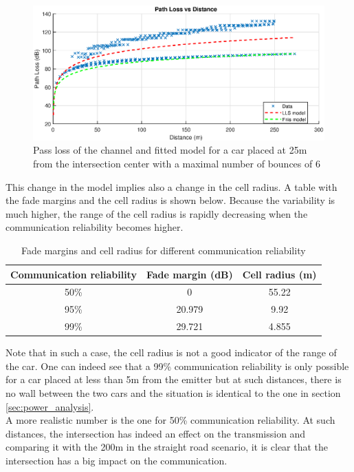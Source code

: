 \documentclass[10pt,a4paper]{ULBreport}
\begin{document}
\begin{figure}
    \centering
    \includegraphics[width=1\textwidth]{6_2.eps}
    \caption{Pass loss of the channel and fitted model for a car placed at 25m from the intersection center with a maximal number of bounces of 6}
    \label{fig:pass_loss_2}
\end{figure}

This change in the model implies also a change in the cell radius. A table with the fade margins and the cell radius is shown below. Because the variability is much higher, the range of the cell radius is rapidly decreasing when the communication reliability becomes higher. \\

\begin{table}[H]
    \centering
    \begin{tabular}{|c|c|c|}
        \hline
        Communication reliability & Fade margin (dB) & Cell radius (m) \\ \hline
        50\% & 0 & 55.22 \\ \hline
        95\% & 20.979 & 9.92 \\ \hline
        99\% & 29.721 & 4.855 \\ \hline
    \end{tabular}
    \caption{Fade margins and cell radius for different communication reliability}
    \label{tab:fade_margins_2}
\end{table}

Note that in such a case, the cell radius is not a good indicator of the range of the car. One can indeed see that a 99\% communication reliability is only possible for a car placed at less than 5m from the emitter but at such distances, there is no wall between the two cars and the situation is identical to the one in section \ref{sec:power_analysis}. \\
A more realistic number is the one for 50\% communication reliability. At such distances, the intersection has indeed an effect on the transmission and comparing it with the 200m in the straight road scenario, it is clear that the intersection has a big impact on the communication. \\



\end{document}
